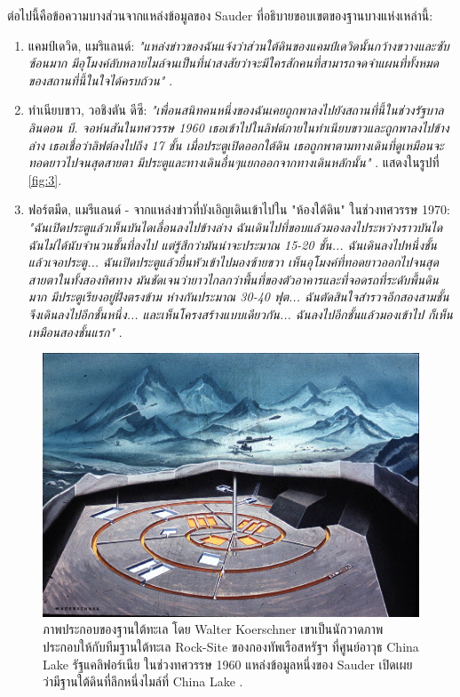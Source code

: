 \documentclass[10pt,twocolumn,letterpaper]{article}
\begin{document}
ต่อไปนี้คือข้อความบางส่วนจากแหล่งข้อมูลของ Sauder ที่อธิบายขอบเขตของฐานบางแห่งเหล่านี้:
\begin{flushleft}
\begin{enumerate}
    \item แคมป์เดวิด, แมริแลนด์: \textit{"แหล่งข่าวของฉันแจ้งว่าส่วนใต้ดินของแคมป์เดวิดนั้นกว้างขวางและซับซ้อนมาก มีอุโมงค์ลับหลายไมล์จนเป็นที่น่าสงสัยว่าจะมีใครสักคนที่สามารถจดจำแผนที่ทั้งหมดของสถานที่นี้ในใจได้ครบถ้วน"} \cite{22}.
    \item ทำเนียบขาว, วอชิงตัน ดีซี: \textit{"เพื่อนสนิทคนหนึ่งของฉันเคยถูกพาลงไปยังสถานที่นี้ในช่วงรัฐบาลลินดอน บี. จอห์นสันในทศวรรษ 1960 เธอเข้าไปในลิฟต์ภายในทำเนียบขาวและถูกพาลงไปข้างล่าง เธอเชื่อว่าลิฟต์ลงไปถึง 17 ชั้น เมื่อประตูเปิดออกใต้ดิน เธอถูกพาตามทางเดินที่ดูเหมือนจะทอดยาวไปจนสุดสายตา มีประตูและทางเดินอื่นๆแยกออกจากทางเดินหลักนั้น"} \cite{22}. แสดงในรูปที่ \ref{fig:3}.
    \item ฟอร์ตมีด, แมรีแลนด์ - จากแหล่งข่าวที่บังเอิญเดินเข้าไปใน "ห้องใต้ดิน" ในช่วงทศวรรษ 1970: \textit{"ฉันเปิดประตูแล้วเห็นบันไดเลื่อนลงไปข้างล่าง ฉันเดินไปที่ขอบแล้วมองลงไประหว่างราวบันได ฉันไม่ได้นับจำนวนชั้นที่ลงไป แต่รู้สึกว่ามันน่าจะประมาณ 15-20 ชั้น... ฉันเดินลงไปหนึ่งชั้นแล้วเจอประตู... ฉันเปิดประตูแล้วยื่นหัวเข้าไปมองซ้ายขวา เห็นอุโมงค์ที่ทอดยาวออกไปจนสุดสายตาในทั้งสองทิศทาง มันชัดเจนว่ายาวไกลกว่าพื้นที่ของตัวอาคารและที่จอดรถที่ระดับพื้นดินมาก มีประตูเรียงอยู่ฝั่งตรงข้าม ห่างกันประมาณ 30-40 ฟุต... ฉันตัดสินใจสำรวจอีกสองสามชั้น จึงเดินลงไปอีกชั้นหนึ่ง... และเห็นโครงสร้างแบบเดียวกัน... ฉันลงไปอีกชั้นแล้วมองเข้าไป ก็เห็นเหมือนสองชั้นแรก"} \cite{22}.
\end{enumerate}
\end{flushleft}

\begin{figure}[t]
\begin{center}
   \includegraphics[width=1\linewidth]{undersea.jpg}
\end{center}
   \caption{ภาพประกอบของฐานใต้ทะเล โดย Walter Koerschner เขาเป็นนักวาดภาพประกอบให้กับทีมฐานใต้ทะเล Rock-Site ของกองทัพเรือสหรัฐฯ ที่ศูนย์อาวุธ China Lake รัฐแคลิฟอร์เนีย ในช่วงทศวรรษ 1960 แหล่งข้อมูลหนึ่งของ Sauder เปิดเผยว่ามีฐานใต้ดินที่ลึกหนึ่งไมล์ที่ China Lake \cite{22,23}.}
\label{fig:5}
\label{fig:onecol}
\end{figure}
\end{document}
